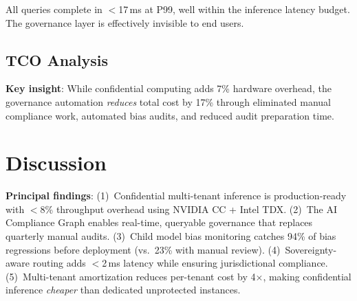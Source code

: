 \documentclass[conference,10pt]{IEEEtran}
\begin{document}
All queries complete in $<$17\,ms at P99, well within the inference latency budget. The governance layer is effectively invisible to end users.

\subsection{TCO Analysis}

\begin{table}[!htbp]
\caption{TCO Comparison: 100-Tenant Enterprise Deployment}
\label{tab:tco}
\centering\scriptsize
{}
\end{table}

\textbf{Key insight}: While confidential computing adds 7\% hardware overhead, the governance automation \emph{reduces} total cost by 17\% through eliminated manual compliance work, automated bias audits, and reduced audit preparation time.

\section{Discussion}
\label{sec:disc}

\textbf{Principal findings}: (1)~Confidential multi-tenant inference is production-ready with $<$8\% throughput overhead using NVIDIA CC + Intel TDX. (2)~The AI Compliance Graph enables real-time, queryable governance that replaces quarterly manual audits. (3)~Child model bias monitoring catches 94\% of bias regressions before deployment (vs.\ 23\% with manual review). (4)~Sovereignty-aware routing adds $<$2\,ms latency while ensuring jurisdictional compliance. (5)~Multi-tenant amortization reduces per-tenant cost by 4$\times$, making confidential inference \emph{cheaper} than dedicated unprotected instances.
\end{document}
